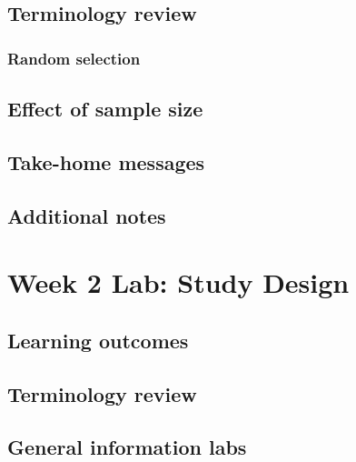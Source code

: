 \documentclass[
]{report}
\begin{document}
\hypertarget{terminology-review-2}{%
\subsection{Terminology review}\label{terminology-review-2}}

\hypertarget{random-selection}{%
\subsubsection*{Random selection}\label{random-selection}}

\hypertarget{effect-of-sample-size}{%
\subsection*{Effect of sample size}\label{effect-of-sample-size}}

\hypertarget{take-home-messages-2}{%
\subsection{Take-home messages}\label{take-home-messages-2}}

\hypertarget{additional-notes-2}{%
\subsection{Additional notes}\label{additional-notes-2}}

\hypertarget{week-2-lab-study-design}{%
\section{Week 2 Lab: Study Design}\label{week-2-lab-study-design}}

\hypertarget{learning-outcomes-3}{%
\subsection{Learning outcomes}\label{learning-outcomes-3}}

\hypertarget{terminology-review-3}{%
\subsection{Terminology review}\label{terminology-review-3}}

\hypertarget{general-information-labs}{%
\subsection{General information labs}\label{general-information-labs}}
\end{document}
